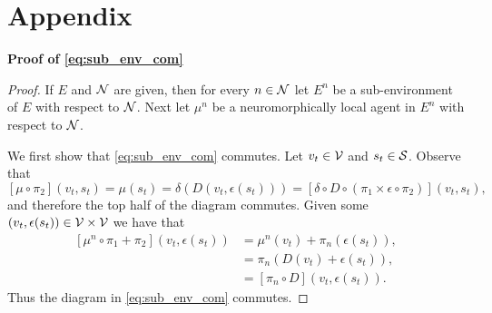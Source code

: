 \section{Appendix}
\textbf{Proof of \eqref{eq:sub_env_com}}
\begin{proof}
  If $E$ and ${\mathcal N}$ are given, then for every $n \in {\mathcal N}$ let $E^n$ be a sub-environment of $E$ with respect to ${\mathcal N}$. Next let $\mu^n$ be a neuromorphically local agent in $E^n$ with respect to ${\mathcal N}$.

  We first show that \eqref{eq:sub_env_com} commutes. Let $v_t \in {\mathcal V}$ and $s_t \in {\mathcal S}$. Observe that
\begin{equation*}
\left[\mu \circ \pi_2\right](v_t, s_t) = \mu(s_t) = \delta\left(D(v_t, \epsilon(s_t))\right) = \left[\delta \circ D \circ (\pi_1 \times \epsilon\circ \pi_2)\right](v_t, s_t),
\end{equation*}
and therefore the top half of the diagram commutes. Given some $(v_t, \epsilon(s_t)) \in {\mathcal V} \times {\mathcal V}$ we have that 
\begin{equation*}
  \begin{aligned}
    \left[ \mu^n \circ \pi_1 + \pi_2\right] (v_t, \epsilon(s_t))  &= \mu^n(v_t) + \pi_n(\epsilon(s_t)),\\
     &= \pi_n\left(D(v_t) + \epsilon(s_t)\right), \\
     &= \left[\pi_n\circ D\right](v_t, \epsilon(s_t)). 
  \end{aligned}
\end{equation*}
Thus the diagram in \eqref{eq:sub_env_com} commutes. 
\end{proof}

